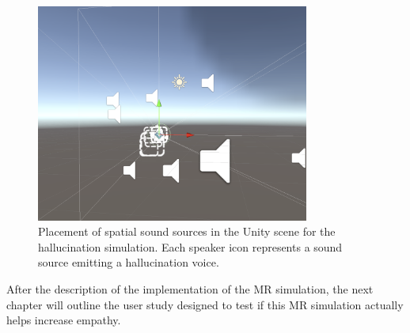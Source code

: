 \begin{figure}[h!] \centering \includegraphics[width=0.8\textwidth]{../../Figures/unity-scene.png} \caption{Placement of spatial sound sources in the Unity scene for the hallucination simulation. Each speaker icon represents a sound source emitting a hallucination voice.} \label{fig:sound_sources} \end{figure}

After the description of the implementation of the MR simulation, the next chapter will outline the user study designed to test if this MR simulation actually helps increase empathy.